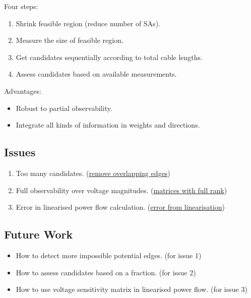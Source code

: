 \documentclass[
]{book}
\providecommand{\tightlist}{%
  \setlength{\itemsep}{0pt}\setlength{\parskip}{0pt}}
\begin{document}
Four steps:

\begin{enumerate}
\def\labelenumi{\arabic{enumi}.}
\tightlist
\item
  Shrink feasible region (reduce number of SAs).
\item
  Measure the size of feasible region.
\item
  Get candidates sequentially according to total cable lengths.
\item
  Assess candidates based on available measurements.
\end{enumerate}

Advantages:

\begin{itemize}
\tightlist
\item
  Robust to partial observability.
\item
  Integrate all kinds of information in weights and directions.
\end{itemize}

\hypertarget{issues}{%
\subsection*{Issues}\label{issues}}

\begin{enumerate}
\def\labelenumi{\arabic{enumi}.}
\tightlist
\item
  Too many candidates. (\protect\hyperlink{overlapping}{remove overlapping edges})
\item
  Full observability over voltage magnitudes. (\protect\hyperlink{BRM}{matrices with full
  rank})
\item
  Error in linearised power flow calculation. (\protect\hyperlink{error}{error from
  linearisation})
\end{enumerate}

\hypertarget{future-work}{%
\subsection*{Future Work}\label{future-work}}

\begin{itemize}
\tightlist
\item
  How to detect more impossible potential edges. (for issue 1)
\item
  How to assess candidates based on a fraction. (for issue 2)
\item
  How to use voltage sensitivity matrix in linearised power flow. (for issue 3)
\end{itemize}

  
\end{document}
